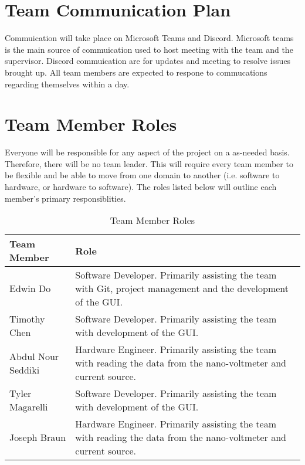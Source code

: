 \documentclass{article}
\begin{document}
\section{Team Communication Plan}
Commuication will take place on Microsoft Teams and Discord. 
Microsoft teams is the main source of commuication used to host meeting with the team and the supervisor. 
Discord commuication are for updates and meeting to resolve issues brought up. 
All team members are expected to respone to commucations regarding themselves within a day.

\section{Team Member Roles}
\indent Everyone will be responsible for any aspect of the project on a as-needed basis. Therefore, there will be no team leader.
This will require every team member to be flexible and be able to move from one domain to another (i.e. software to hardware, or hardware to software).
The roles listed below will outline each member's primary responsiblities.
\begin{table}[h!]
    \centering

	
    \begin{tabular}{p{} p{}}

    \toprule
    \textbf{Team Member} & \textbf{Role}\\

    \midrule{Edwin Do} & Software Developer. Primarily assisting the team with Git, project management and the development of the GUI. \\
    \midrule{Timothy Chen} & Software Developer. Primarily assisting the team with development of the GUI. \\
    \midrule{Abdul Nour Seddiki} & Hardware Engineer. Primarily assisting the team with reading the data from the nano-voltmeter and current source. \\
    \midrule{Tyler Magarelli} & Software Developer. Primarily assisting the team with development of the GUI. \\
    \midrule{Joseph Braun} & Hardware Engineer. Primarily assisting the team with reading the data from the nano-voltmeter and current source.  \\

    \bottomrule

    \end{tabular}
    \caption{Team Member Roles}
\end{table}
\end{document}
